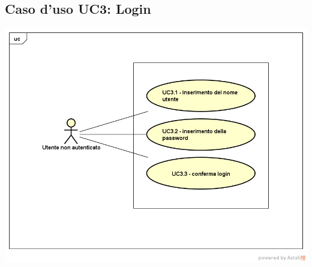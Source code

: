 \subsection{Caso d'uso UC3: Login}
\begin{center}
	\includegraphics[scale=0.5]{UML/UC3-login.png}
\end{center}
